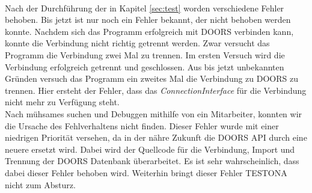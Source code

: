 \paragraph{}
Nach der Durchführung der in Kapitel \ref{sec:test} worden verschiedene Fehler behoben. Bis jetzt ist nur noch ein Fehler bekannt, der nicht behoben werden konnte. Nachdem sich das Programm erfolgreich mit DOORS verbinden kann, konnte die Verbindung nicht richtig getrennt werden. Zwar versucht das Programm die Verbindung zwei Mal zu trennen. Im ersten Versuch wird die Verbindung erfolgreich getrennt und geschlossen. Aus bis jetzt unbekannten Gründen versuch das Programm ein zweites Mal die Verbindung zu DOORS zu trennen. Hier ersteht der Fehler, dass das \textit{ConnectionInterface} für die Verbindung nicht mehr zu Verfügung steht.\\


Nach mühsames suchen und Debuggen mithilfe von ein Mitarbeiter, konnten wir die Ursache des Fehlverhaltens nicht finden. Dieser Fehler wurde mit einer niedrigen Priorität versehen, da in der nähre Zukunft die DOORS API durch eine neuere ersetzt wird. Dabei wird der Quellcode für die Verbindung, Import und Trennung der DOORS Datenbank überarbeitet. Es ist sehr wahrscheinlich, dass dabei dieser Fehler behoben wird. Weiterhin bringt dieser Fehler TESTONA nicht zum Absturz. 
